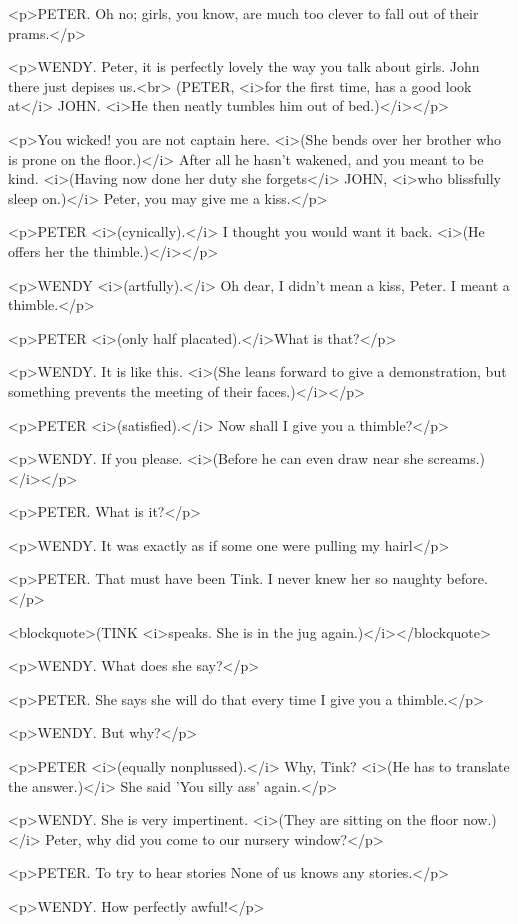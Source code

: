 <p>PETER. Oh no; girls, you know, are much too clever to fall out of
their prams.</p>

<p>WENDY. Peter, it is perfectly lovely the way you talk about girls.
John there just depises us.<br>
(PETER, <i>for the first time, has a good look at</i> JOHN. <i>He
then neatly tumbles him out of bed.)</i></p>

<p>You wicked! you are not captain here. <i>(She bends over her
brother who is prone on the floor.)</i> After all he hasn't wakened,
and you meant to be kind. <i>(Having now done her duty she
forgets</i> JOHN, <i>who blissfully sleep on.)</i> Peter, you may
give me a kiss.</p>

<p>PETER <i>(cynically).</i> I thought you would want it back. <i>(He
offers her the thimble.)</i></p>

<p>WENDY <i>(artfully).</i> Oh dear, I didn't mean a kiss, Peter. I
meant a thimble.</p>

<p>PETER <i>(only half placated).</i>What is that?</p>

<p>WENDY. It is like this. <i>(She leans forward to give a
demonstration, but something prevents the meeting of their
faces.)</i></p>

<p>PETER <i>(satisfied).</i> Now shall I give you a thimble?</p>

<p>WENDY. If you please. <i>(Before he can even draw near she
screams.)</i></p>

<p>PETER. What is it?</p>

<p>WENDY. It was exactly as if some one were pulling my hairl</p>

<p>PETER. That must have been Tink. I never knew her so naughty
before.</p>

<blockquote>(TINK <i>speaks. She is in the jug
again.)</i></blockquote>

<p>WENDY. What does she say?</p>

<p>PETER. She says she will do that every time I give you a
thimble.</p>

<p>WENDY. But why?</p>

<p>PETER <i>(equally nonplussed).</i> Why, Tink? <i>(He has to
translate the answer.)</i> She said 'You silly ass' again.</p>

<p>WENDY. She is very impertinent. <i>(They are sitting on the floor
now.)</i> Peter, why did you come to our nursery window?</p>

<p>PETER. To try to hear stories None of us knows any stories.</p>

<p>WENDY. How perfectly awful!</p>

